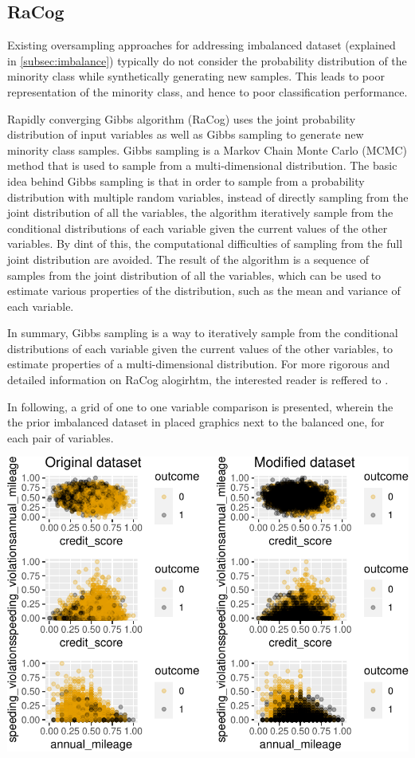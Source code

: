\documentclass{article}
\begin{document}
\hypertarget{racog}{%
\subsection{\texorpdfstring{RaCog
\label{subsec:racog}}{RaCog }}\label{racog}}

Existing oversampling approaches for addressing imbalanced dataset
(explained in \ref{subsec:imbalance}) typically do not consider the
probability distribution of the minority class while synthetically
generating new samples. This leads to poor representation of the
minority class, and hence to poor classification performance.

Rapidly converging Gibbs algorithm (RaCog) uses the joint probability
distribution of input variables as well as Gibbs sampling to generate
new minority class samples. Gibbs sampling is a Markov Chain Monte Carlo
(MCMC) method \cite{bishop} that is used to sample from a
multi-dimensional distribution. The basic idea behind Gibbs sampling is
that in order to sample from a probability distribution with multiple
random variables, instead of directly sampling from the joint
distribution of all the variables, the algorithm iteratively sample from
the conditional distributions of each variable given the current values
of the other variables. By dint of this, the computational difficulties
of sampling from the full joint distribution are avoided. The result of
the algorithm is a sequence of samples from the joint distribution of
all the variables, which can be used to estimate various properties of
the distribution, such as the mean and variance of each variable.

In summary, Gibbs sampling is a way to iteratively sample from the
conditional distributions of each variable given the current values of
the other variables, to estimate properties of a multi-dimensional
distribution. For more rigorous and detailed information on RaCog
alogirhtm, the interested reader is reffered to \cite{racog}.

In following, a grid of one to one variable comparison is presented,
wherein the the prior imbalanced dataset in placed graphics next to the
balanced one, for each pair of variables.

\newpage

\includegraphics{report_files/figure-latex/unnamed-chunk-8-1.pdf}
\end{document}

